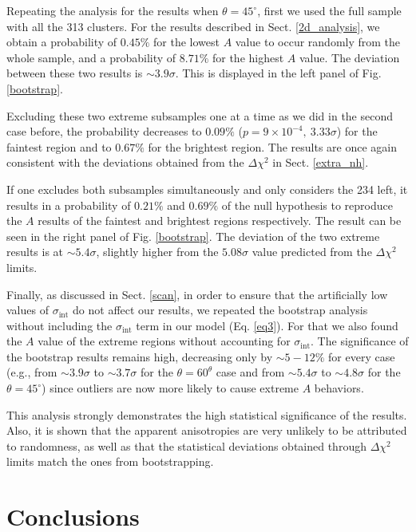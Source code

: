 \documentclass{aa}   %
\begin{document}
Repeating the analysis for the results when $\theta=45^{\circ}$, first we used the full sample with all the 313 clusters. For the results described in Sect. \ref{2d_analysis}, we obtain a probability of $0.45\%$ for the lowest $A$ value to occur randomly from the whole sample, and a probability of $8.71\%$ for the highest $A$ value. The deviation between these two results is $\sim 3.9 \sigma$. This is displayed in the left panel of Fig. \ref{bootstrap}.

Excluding these two extreme subsamples one at a time as we did in the second case before, the probability decreases to $0.09\%$ ($p=9\times 10^{-4},\ 3.33\sigma$) for the faintest region and to $0.67\%$ for the brightest region. The results are once again consistent with the deviations obtained from the $\Delta \chi^2$ in Sect. \ref{extra_nh}. 

If one excludes both subsamples simultaneously and only considers the 234 left, it results in a probability of $0.21\%$ and $0.69\%$ of the null hypothesis to reproduce the $A$ results of the faintest and brightest regions respectively. The result can be seen in the right panel of Fig. \ref{bootstrap}. The deviation of the two extreme results is at $\sim 5.4\sigma$, slightly higher from the $5.08\sigma$ value predicted from the $\Delta \chi^2$ limits.

Finally, as discussed in Sect. \ref{scan}, in order to ensure that the artificially low values of $\sigma_{\text{int}}$ do not affect our results, we repeated the bootstrap analysis without including the $\sigma_{\text{int}}$ term in our model (Eq. \ref{eq3}). For that we also found the $A$ value of the extreme regions without accounting for $\sigma_{\text{int}}$. The significance of the bootstrap results remains high, decreasing only by $\sim 5-12\%$ for every case (e.g., from $\sim 3.9\sigma$ to $\sim 3.7\sigma$ for the $\theta=60^{\theta}$ case and from $\sim 5.4\sigma$ to $\sim 4.8\sigma$ for the  $\theta=45^{\circ}$) since outliers are now more likely to cause extreme $A$ behaviors.

This analysis strongly demonstrates the high statistical significance of the results. Also, it is shown that the apparent anisotropies are very unlikely to be attributed to randomness, as well as that the statistical deviations obtained through $\Delta \chi^2$ limits match the ones from bootstrapping.


\section{Conclusions}\label{conclusions}
\end{document}
